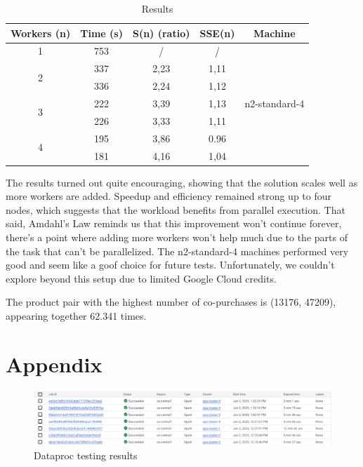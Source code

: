 \documentclass[conference]{IEEEtran}
\begin{document}
\renewcommand{\arraystretch}{1.2}
\begin{table}[htbp]
\caption{Results}
\begin{center}
\begin{tabular}{|c|c|c|c|c|}
\hline
\textbf{Workers (n)}& \textbf{Time (s)}& \textbf{S(n) (ratio)}& \textbf{SSE(n)}& \textbf{Machine}\\
\hline
1& 753& \slash& \slash& \multirow{7}{*}{n2-standard-4} \\
\cline{1-4}
\multirow{2}{*}{2}  & 337& 2,23& 1,11& \\
\cline{2-4}
                    & 336& 2,24& 1,12& \\
\cline{1-4}
\multirow{2}{*}{3}  & 222& 3,39& 1,13& \\
\cline{2-4}
                    & 226& 3,33& 1,11& \\
\cline{1-4}
\multirow{2}{*}{4}  & 195& 3,86& 0.96& \\
\cline{2-4}
                    & 181& 4,16& 1,04& \\
\hline
\end{tabular}
\label{tab:results}
\end{center}
\end{table}

The results turned out quite encouraging, showing that the solution scales well as more workers are added. Speedup and efficiency remained strong up to four nodes, which suggests that the workload benefits from parallel execution. That said, Amdahl’s Law reminds us that this improvement won’t continue forever, there’s a point where adding more workers won’t help much due to the parts of the task that can’t be parallelized. The n2-standard-4 machines performed very good and seem like a goof choice for future tests. Unfortunately, we couldn’t explore beyond this setup due to limited Google Cloud credits.

The product pair with the highest number of co-purchases is (13176, 47209), appearing together 62.341 times.




\section*{Appendix}

\begin{figure}[htpb]
    \centering
    \includegraphics[width=\linewidth]{dataproc-testing.png}
    \caption{Dataproc testing results}
    \label{fig:dataproc-testing}
\end{figure}
\end{document}
